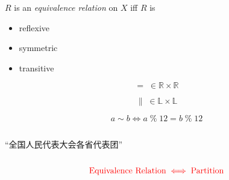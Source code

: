 
\begin{frame}{}
  \begin{center}
  \end{center}
\end{frame}

\begin{frame}{}
  \begin{definition}
    $R$ is an {\it equivalence relation} on $X$ iff $R$ is 
    \begin{itemize}
      \item reflexive 
      \item symmetric
      \item transitive
    \end{itemize}
  \end{definition}

  \pause
  \[
    =\; \in \mathbb{R} \times \mathbb{R}
  \]

  \pause
  \[
    \parallel\; \in \mathbb{L} \times \mathbb{L}
  \]

  \pause
  \[
    a \sim b \iff a \;\%\; 12 = b \;\%\; 12
  \]

  \pause
  \begin{center}
  \end{center}
\end{frame}

\begin{frame}{}
  \begin{center}
  \end{center}

  \begin{columns}
      \pause
      \pause
      \begin{center}
	``全国人民代表大会各省代表团''
      \end{center}
  \end{columns}

  \pause
  \vspace{0.60cm}
  \[
    \textcolor{red}{\text{Equivalence Relation} \iff \text{Partition}}
  \]
\end{frame}


